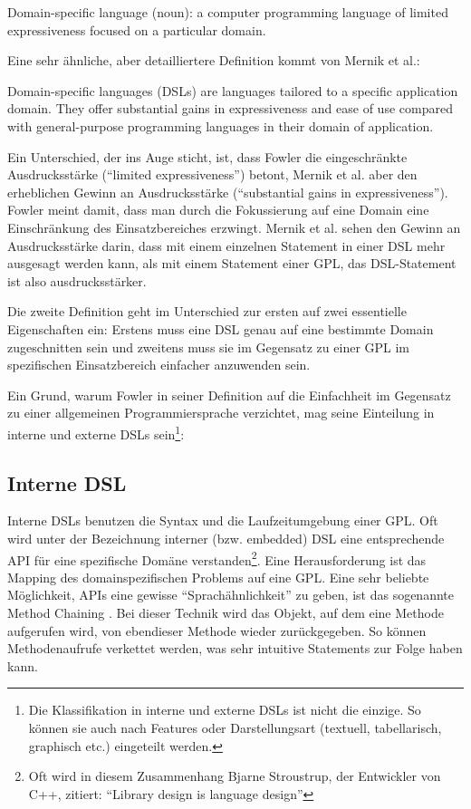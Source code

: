\begin{myquote}
Domain-specific language (noun): a computer programming language of limited expressiveness focused on a particular domain. \cite{Fowl05}
\end{myquote}

Eine sehr ähnliche, aber detailliertere Definition kommt von Mernik et al.:

\begin{myquote}
Domain-specific languages (DSLs) are languages tailored to a specific application domain. They offer substantial gains in expressiveness and ease of use compared with general-purpose programming languages in their domain of application. \cite{MeHe05}
\end{myquote}


Ein Unterschied, der ins Auge sticht, ist, dass Fowler die eingeschränkte Ausdrucksstärke (``limited ex\-pre\-ssive\-ness'') betont, Mernik et al. aber den erheblichen Gewinn an Ausdrucksstärke (``substantial gains in ex\-pre\-ssive\-ness''). Fowler meint damit, dass man durch die Fokussierung auf eine Domain eine Einschränkung des Einsatzbereiches erzwingt. Mernik et al. sehen den Gewinn an Ausdrucksstärke darin, dass mit einem einzelnen Statement in einer DSL mehr ausgesagt werden kann, als mit einem Statement einer GPL, das DSL-Statement ist also ausdrucksstärker.

Die zweite Definition geht im Unterschied zur ersten auf zwei essentielle Eigenschaften ein: Erstens muss eine DSL genau auf eine bestimmte Domain zugeschnitten sein und zweitens muss sie im Gegensatz zu einer GPL im spezifischen Einsatzbereich einfacher anzuwenden sein.

Ein Grund, warum Fowler in seiner Definition auf die Einfachheit im Gegensatz zu einer allgemeinen Programmiersprache verzichtet, mag seine Einteilung in interne und externe DSLs \cite{FoPa10} sein\footnote{Die Klassifikation in interne und externe DSLs ist nicht die einzige. So können sie auch nach Features oder Darstellungsart (textuell, tabellarisch, graphisch etc.) eingeteilt werden\cite{LaJi07}. }:

\subsection{Interne DSL}

Interne DSLs benutzen die Syntax und die Laufzeitumgebung einer GPL. Oft wird unter der Bezeichnung interner (bzw. embedded) DSL eine ent\-spre\-chen\-de API für eine spezifische Domäne verstanden\footnote{Oft wird in diesem Zusammenhang Bjarne Stroustrup, der Entwickler von C++, zitiert: ``Library design is language design''}.
Eine Herausforderung ist das Mapping des domainspezifischen Problems auf eine GPL. Eine sehr beliebte Möglichkeit, APIs eine gewisse ``Sprachähnlichkeit'' zu geben, ist das sogenannte Method Chaining
\cite{RuBa08}.
Bei dieser Technik wird das Objekt, auf dem eine Methode aufgerufen wird, von ebendieser Methode wieder zurückgegeben. So können Methodenaufrufe verkettet werden, was sehr intuitive Statements zur Folge haben kann.

